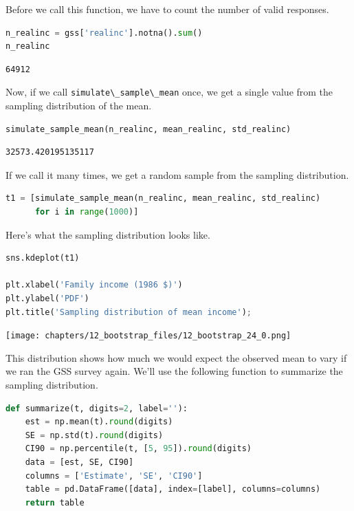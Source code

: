 Before we call this function, we have to count the number of valid
responses.

\begin{lstlisting}[language=Python,style=source]
n_realinc = gss['realinc'].notna().sum()
n_realinc
\end{lstlisting}

\begin{lstlisting}[style=output]
64912
\end{lstlisting}

Now, if we call \passthrough{\lstinline!simulate\_sample\_mean!} once,
we get a single value from the sampling distribution of the mean.

\begin{lstlisting}[language=Python,style=source]
simulate_sample_mean(n_realinc, mean_realinc, std_realinc)
\end{lstlisting}

\begin{lstlisting}[style=output]
32573.420195135117
\end{lstlisting}

If we call it many times, we get a random sample from the sampling
distribution.

\begin{lstlisting}[language=Python,style=source]
t1 = [simulate_sample_mean(n_realinc, mean_realinc, std_realinc)
      for i in range(1000)]
\end{lstlisting}

Here's what the sampling distribution looks like.

\begin{lstlisting}[language=Python,style=source]
sns.kdeplot(t1)

plt.xlabel('Family income (1986 $)')
plt.ylabel('PDF')
plt.title('Sampling distribution of mean income');
\end{lstlisting}

\begin{center}
\texttt{[image: chapters/12\_bootstrap\_files/12\_bootstrap\_24\_0.png]}
\end{center}

This distribution shows how much we would expect the observed mean to
vary if we ran the GSS survey again. We'll use the following function to
summarize the sampling distribution.

\begin{lstlisting}[language=Python,style=source]
def summarize(t, digits=2, label=''):
    est = np.mean(t).round(digits)
    SE = np.std(t).round(digits)
    CI90 = np.percentile(t, [5, 95]).round(digits)
    data = [est, SE, CI90]
    columns = ['Estimate', 'SE', 'CI90']
    table = pd.DataFrame([data], index=[label], columns=columns)
    return table
\end{lstlisting}

